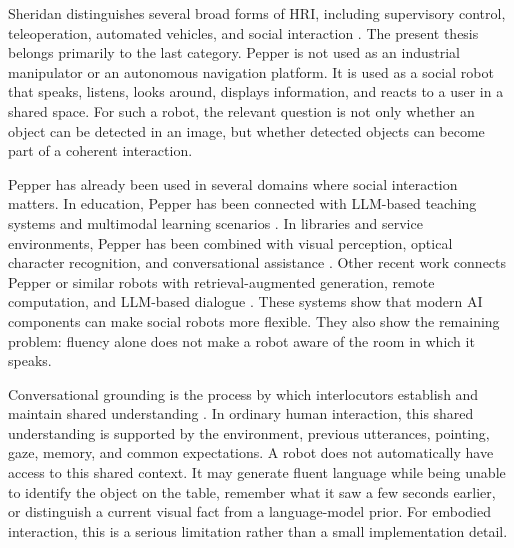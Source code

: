 Sheridan distinguishes several broad forms of HRI, including supervisory control, teleoperation, automated vehicles, and social interaction \cite[525--526]{Sheridan2016HRI}. The present thesis belongs primarily to the last category. Pepper is not used as an industrial manipulator or an autonomous navigation platform. It is used as a social robot that speaks, listens, looks around, displays information, and reacts to a user in a shared space. For such a robot, the relevant question is not only whether an object can be detected in an image, but whether detected objects can become part of a coherent interaction.

Pepper has already been used in several domains where social interaction matters. In education, Pepper has been connected with LLM-based teaching systems and multimodal learning scenarios \cite{sievers_humanoid_2025,latif_physicsassistant_2024}. In libraries and service environments, Pepper has been combined with visual perception, optical character recognition, and conversational assistance \cite{trinquet_future_2025}. Other recent work connects Pepper or similar robots with retrieval-augmented generation, remote computation, and LLM-based dialogue \cite{brad_retrieval-augmented_2025,becerra_improving_2024,grassi_grounding_2024}. These systems show that modern AI components can make social robots more flexible. They also show the remaining problem: fluency alone does not make a robot aware of the room in which it speaks.

Conversational grounding is the process by which interlocutors establish and maintain shared understanding \cite{Clark_1996}. In ordinary human interaction, this shared understanding is supported by the environment, previous utterances, pointing, gaze, memory, and common expectations. A robot does not automatically have access to this shared context. It may generate fluent language while being unable to identify the object on the table, remember what it saw a few seconds earlier, or distinguish a current visual fact from a language-model prior. For embodied interaction, this is a serious limitation rather than a small implementation detail.

